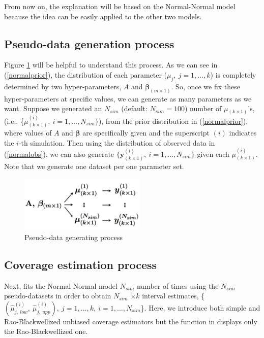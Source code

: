 \documentclass[article]{jss}
\begin{document}
From now on, the explanation will be based on the Normal-Normal model because the idea can be easily applied to the other two models.

\subsection{Pseudo-data generation process}
Figure \ref{fig:pseudo} will be helpful to understand this process. As we can see in (\ref{normalprior}), the distribution of each parameter ($\mu_{j},~j=1,\ldots, k$) is completely determined by two hyper-parameters, $A$ and $\boldsymbol{\beta}_{(m\times1)}$. So, once we fix these hyper-parameters at specific values, we can generate as many parameters as we want. Suppose we generated an $N_{sim}$ (default: $N_{sim} = 100$) number of {\boldmath $\mu$}$_{(k\times1)}$'s, (i.e., \{{\boldmath $\mu$}$^{(i)}_{(k\times1)},~i=1, \ldots, N_{sim}\}$), from the prior distribution in (\ref{normalprior}), where values of $A$ and $\boldsymbol{\beta}$ are specifically given and the superscript $(i)$ indicates the $i$-th simulation. Then using the distribution of observed data in (\ref{normalobs}), we can also generate $\{\boldsymbol{y}^{(i)}_{(k\times1)},~i=1, \ldots, N_{sim}\}$ given each {\boldmath$\mu$}$^{(i)}_{(k\times1)}$. Note that we generate one dataset per one parameter set.

\begin{figure}[h]
\begin{center}
\includegraphics[width=6cm]{process.png}
\caption{Pseudo-data generating process}
\label{fig:pseudo}
\end{center}
\end{figure}

\subsection{Coverage estimation process}
Next,  fits the Normal-Normal model  $N_{sim}$ number of times using the $N_{sim}$ pseudo-datasets in order to obtain $N_{sim}$ $\times k$ interval estimates,  \{$(\hat{\mu}^{(i)}_{j, ~low}, ~\hat{\mu}^{(i)}_{j, ~upp}), ~j=1,\ldots, k,~ i=1, \ldots, N_{sim}$\}.  Here, we introduce both simple and Rao-Blackwellized unbiased coverage estimators but the function  in  displays only the Rao-Blackwellized one.
\end{document}
